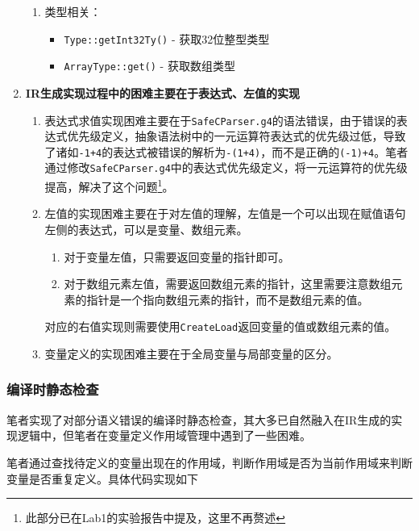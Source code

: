 \documentclass[../main.tex]{subfiles}
\begin{document}
\begin{enumerate}
\begin{enumerate}
		      \item 类型相关：
		            \begin{itemize}
			            \item \texttt{Type::getInt32Ty()} - 获取32位整型类型
			            \item \texttt{ArrayType::get()} - 获取数组类型
		            \end{itemize}
	      \end{enumerate}
	\item \textbf{IR生成实现过程中的困难主要在于表达式、左值的实现}
	      \begin{enumerate}
		      \item 表达式求值实现困难主要在于\texttt{SafeCParser.g4}的语法错误，由于错误的表达式优先级定义，抽象语法树中的一元运算符表达式的优先级过低，导致了诸如\texttt{-1+4}的表达式被错误的解析为\texttt{-(1+4)}，而不是正确的\texttt{(-1)+4}。笔者通过修改\texttt{SafeCParser.g4}中的表达式优先级定义，将一元运算符的优先级提高，解决了这个问题\footnote{此部分已在Lab1的实验报告中提及，这里不再赘述}。
		      \item 左值的实现困难主要在于对左值的理解，左值是一个可以出现在赋值语句左侧的表达式，可以是变量、数组元素。
		            \begin{enumerate}
			            \item 对于变量左值，只需要返回变量的指针即可。
			            \item 对于数组元素左值，需要返回数组元素的指针，这里需要注意数组元素的指针是一个指向数组元素的指针，而不是数组元素的值。
		            \end{enumerate}

		            对应的右值实现则需要使用\texttt{CreateLoad}返回变量的值或数组元素的值。

		      \item 变量定义的实现困难主要在于全局变量与局部变量的区分。
	      \end{enumerate}
\end{enumerate}

\subsubsection{编译时静态检查}

笔者实现了对部分语义错误的编译时静态检查，其大多已自然融入在IR生成的实现逻辑中，但笔者在变量定义作用域管理中遇到了一些困难。

笔者通过查找待定义的变量出现在的作用域，判断作用域是否为当前作用域来判断变量是否重复定义。具体代码实现如下
\end{document}
